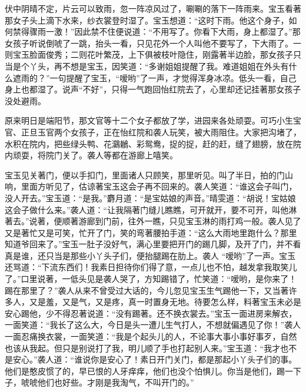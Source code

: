 \begin{parag}
    伏中阴晴不定，片云可以致雨，忽一阵凉风过了，唰唰的落下一阵雨来。宝玉看著那女子头上滴下水来，纱衣裳登时湿了。宝玉想道：“这时下雨。他这个身子，如何禁得骤雨一激！”因此禁不住便说道：“不用写了。你看下大雨，身上都湿了。”那女孩子听说倒唬了一跳，抬头一看，只见花外一个人叫他不要写了，下大雨了。一则宝玉脸面俊秀；二则花叶繁茂，上下俱被枝叶隐住，刚露著半边脸，那女孩子只当是个丫头，再不想是宝玉，因笑道：“多谢姐姐提醒了我。难道姐姐在外头有什么遮雨的？”一句提醒了宝玉，“嗳哟”了一声，才觉得浑身冰凉。低头一看，自己身上也都湿了。说声“不好”，只得一气跑回怡红院去了，心里却还记挂著那女孩子没处避雨。
\end{parag}


\begin{parag}
    原来明日是端阳节，那文官等十二个女子都放了学，进园来各处顽耍。可巧小生宝官、正旦玉官两个女孩子，正在怡红院和袭人玩笑，被大雨阻住。大家把沟堵了，水积在院内，把些绿头鸭、花鸂鶒、彩鸳鸯，捉的捉，赶的赶，缝了翅膀，放在院内顽耍，将院门关了。袭人等都在游廊上嘻笑。
\end{parag}


\begin{parag}
    宝玉见关著门，便以手扣门，里面诸人只顾笑，那里听见。叫了半日，拍的门山响，里面方听见了，估谅著宝玉这会子再不回来的。袭人笑道：“谁这会子叫门，没人开去。”宝玉道：“是我。”麝月道：“是宝姑娘的声音。”晴雯道：“胡说！宝姑娘这会子做什么来。”袭人道：“让我隔著门缝儿瞧瞧，可开就开，要不可开，叫他淋著去。”说著，便顺著游廊到门前，往外一瞧，只见宝玉淋的雨打鸡一般。袭人见了又是著忙又是可笑，忙开了门，笑的弯著腰拍手道：“这么大雨地里跑什么？那里知道爷回来了。”宝玉一肚子没好气，满心里要把开门的踢几脚，及开了门，并不看真是谁，还只当是那些小丫头子们，便抬腿踢在肋上。袭人 “嗳哟”了一声。宝玉还骂道：“下流东西们！我素日担待你们得了意，一点儿也不怕，越发拿我取笑儿了。”口里说著，一低头见是袭人哭了，方知踢错了，忙笑道：“嗳哟，是你来了！踢在那里了？”袭人从来不曾受过大话的，今儿忽见宝玉生气踢他一下，又当著许多人，又是羞，又是气，又是疼，真一时置身无地。待要怎么样，料著宝玉未必是安心踢他，少不得忍著说道：“没有踢著。还不换衣裳去。”宝玉一面进房来解衣，一面笑道：“我长了这么大，今日是头一遭儿生气打人，不想就偏遇见了你！”袭人一面忍痛换衣裳，一面笑道：“我是个起头儿的人，不论事大事小事好事歹，自然也该从我起。但只是别说打了我，明儿顺了手也打起别人来。”宝玉道：“我才也不是安心。”袭人道：“谁说你是安心了！素日开门关门，都是那起小丫头子们的事。他们是憨皮惯了的，早已恨的人牙痒痒，他们也没个怕惧儿。你当是他们，踢一下子，唬唬他们也好些。才刚是我淘气，不叫开门的。”
\end{parag}


